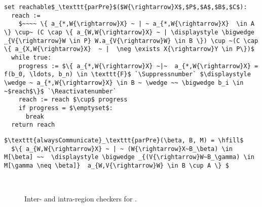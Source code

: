 \newsavebox{\parcheckers}
\begin{lrbox}{\parcheckers}%
\begin{minipage}{1\columnwidth}
\centering
\begin{lstlisting}[mathescape,escapechar=\`,morekeywords={set,return}]
set reachable$_\texttt{parPre}$($W{\rightarrow}X$,$P$,$A$,$B$,$C$):  
  reach :=
    $~~~~ \{ a_{*,W{\rightarrow}X} ~ | ~ a_{*,W{\rightarrow}X}  \in A \} \cup~ (C \cap \{ a_{W,W{\rightarrow}X} ~ | \displaystyle \bigwedge _{V{\rightarrow}W \in P} W.a_{V{\rightarrow}W} \in B \}) \cup ~(C \cap \{ a_{X,W{\rightarrow}X}  ~ |  \neg \exists X{\rightarrow}Y \in P\})$
  while true:    
    progress := $\{ a_{*,W{\rightarrow}X} ~|~  a_{*,W{\rightarrow}X} = f(b_0, \ldots, b_n) \in \texttt{F}$ `\Suppressnumber` $\displaystyle \wedge ~ a_{*,W{\rightarrow}X} \in B ~ \wedge ~~ \bigwedge b_i \in ~$reach$\}$ `\Reactivatenumber`
    reach := reach $\cup$ progress
    if progress = $\emptyset$:
      break
  return reach  
\end{lstlisting}
\end{minipage}
\end{lrbox}

\newsavebox{\comcheckers}
\begin{lrbox}{\comcheckers}
\begin{minipage}{1\columnwidth}
\centering
\begin{lstlisting}[mathescape,escapechar=\`,morekeywords={set,return}]
$\texttt{alwaysCommunicate}_\texttt{parPre}(\beta, B, M) = \hfill$
  $\{ a_{W,W{\rightarrow}X} ~ | ~ (W{\rightarrow}X~B_\beta) \in M[\beta] ~~  \displaystyle \bigwedge _{(V{\rightarrow}W~B_\gamma) \in M[\gamma \neq \beta]}  a_{W,V{\rightarrow}W} \in B \cup A \} $
\end{lstlisting}




\end{minipage}
\end{lrbox}


\begin{figure}[t]
 \\
\caption{Inter- and intra-region checkers for .}
\label{fig:checkers}
\end{figure}
 
 